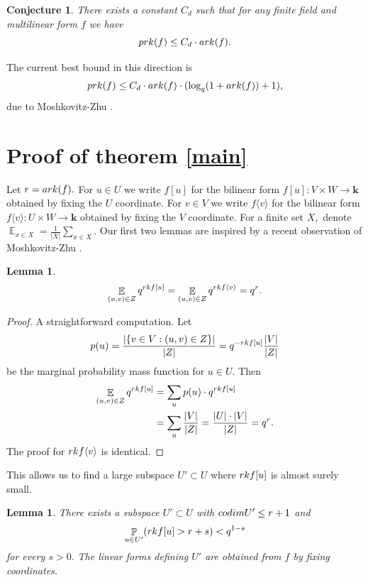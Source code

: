 \documentclass{daj}
\newtheorem{lemma}[theorem]{Lemma}
\newtheorem{conjecture}[theorem]{Conjecture}
\renewcommand{\k}{{\mathbf{k}}}
\newcommand{\E}{\mathop{\mathbb{E}}}
\renewcommand{\P}{\mathop{\mathbb{P}}}
\newcommand{\codim}{\textnormal{codim}}
\newcommand{\rk}{\textnormal{rk}}
\newcommand{\ark}{\textnormal{ark}}
\newcommand{\prk}{\textnormal{prk}}
\begin{document}
\begin{conjecture}
    There exists a constant $C_d$ such that for any finite field and multilinear form $f$ we have 
    \[
    \prk(f) \le C_d\cdot \ark(f).
    \]
\end{conjecture}

The current best bound in this direction is 
$$\prk(f) \le C_d\cdot \ark(f) \cdot (\log_q (1+\ark(f))+1),$$
due to Moshkovitz-Zhu \cite{MZ}.


\section{Proof of theorem \ref{main}}

Let $r=\ark(f).$ For $u\in U$ we write $f[u]$ for the bilinear form $f[u]:V\times W\to \k $ obtained by fixing the $U$ coordinate. For $v\in V$ we write $f\langle v\rangle$ for the bilinear form $f\langle v\rangle: U\times W\to \k$ obtained by fixing the $V$ coordinate. For a finite set $X,$ denote $\E_{x\in X} = \frac{1}{|X|} \sum_{x\in X}.$ Our first two lemmas are inspired by a recent observation of Moshkovitz-Zhu \cite{MZ}.
\begin{lemma}
    \[
    \E_{(u,v)\in Z} q^{\rk f[u]} = \E_{(u,v)\in Z} q^{\rk f\langle v\rangle} = q^r.
    \]
\end{lemma}

\begin{proof}
    A straightforward computation. Let
    $$p(u) = \frac{|\{v\in V:(u,v)\in Z\}|}{|Z|} = q^{-\rk f[u]} \frac{|V|}{|Z|}$$
    be the marginal probability mass function for $u\in U.$ Then 
    \begin{align*}
        \E_{(u,v)\in Z} q^{\rk f[u]} &=  \sum_u p(u)\cdot  q^{\rk f[u]} \\
        &= \sum_u \frac{|V|}{|Z|} = \frac{|U|\cdot|V|}{|Z|} = q^r.  
    \end{align*}
    The proof for $\rk f\langle v\rangle$ is identical.
\end{proof}

This allows us to find a large subspace $U'\subset U$ where $\rk f[u]$ is almost surely small.

\begin{lemma}\label{subspace}
    There exists a subspace $U'\subset U$ with $\codim U' \le r+1$ and 
    \[
    \P_{u\in U'} (\rk f[u] > r+s) < q^{1-s}
    \]
    for every $s>0.$ The linear forms defining $U'$ are obtained from $f$ by fixing coordinates.
\end{lemma}
\end{document}
